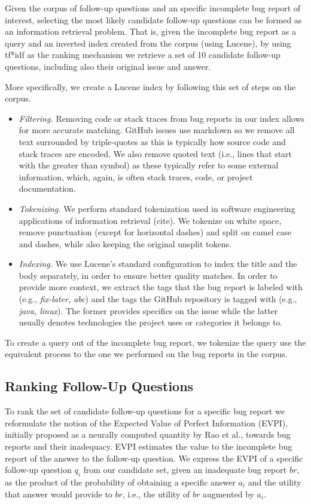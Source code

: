 Given the corpus of follow-up questions and an specific incomplete bug report of interest, selecting the
most likely candidate follow-up questions can be formed as an information retrieval
problem. That is, given the incomplete bug report as a query and an inverted index
created from the corpus (using Lucene), by using tf*idf as the ranking mechanism we
retrieve a set of 10 candidate follow-up questions, including also their original issue
and answer.

More specifically, we create a Lucene index by following this set of steps
on the corpus.
\begin{itemize}
\item {\em Filtering.} Removing code or stack traces from bug reports in our index allows
for more accurate matching. GitHub issues use markdown so we remove all text surrounded
by triple-quotes as this is typically how source code and stack traces are encoded. We also
remove quoted text (i.e., lines that start with the greater than symbol) as these typically
refer to some external information, which, again, is often stack traces, code, or project documentation.
\item {\em Tokenizing.} We perform standard tokenization used in software engineering applications
of information retrieval (cite). We tokenize on white space, remove punctuation (except for horizontal dashes)
and split on camel case and dashes, while also keeping the original unsplit tokens.
\item {\em Indexing.} We use Lucene's standard configuration to index the title and the body separately,
in order to ensure better quality matches. In order to provide more context, we extract the tags that the bug report
is labeled with (e.g., {\em fix-later, abc}) and the tags the GitHub repository is tagged with
(e.g., {\em java, linux}). The former provides specifics on the issue while the latter usually denotes
technologies the project uses or categories it belongs to.
\end{itemize}

To create a query out of the incomplete bug report, we tokenize the query use the equivalent process to
the one we performed on the bug reports in the corpus.


\subsection{Ranking Follow-Up Questions}

To rank the set of candidate follow-up questions for a specific bug report we reformulate
the notion of the Expected Value of Perfect Information (EVPI), initially proposed as a
neurally computed quantity by Rao et al., towards bug reports and their inadequacy. EVPI estimates
the value to the incomplete bug report of the answer to the follow-up question. We express
the EVPI of a specific follow-up question $q_{i}$ from our candidate set, given an inadequate
bug report $br$, as the product of the probability of obtaining a specific answer $a_{i}$ and
the utility that answer would provide to $br$, i.e., the utility of $br$ augmented by $a_{i}$.

